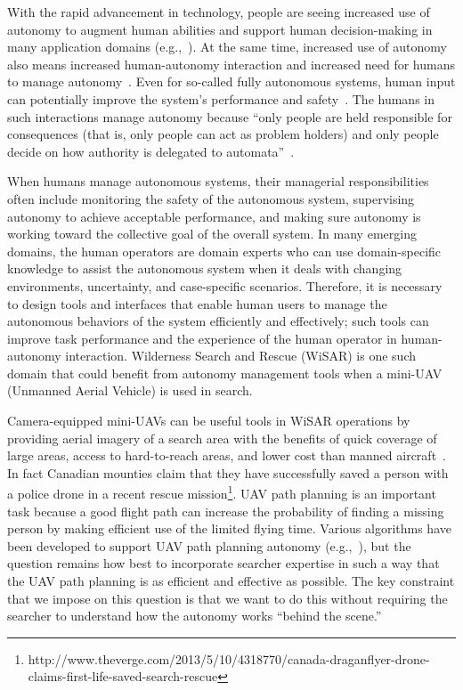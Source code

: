 With the rapid advancement in technology, people are seeing increased use of autonomy to augment human abilities and support human decision-making in many application domains (e.g.,~\cite{Chun2010Limousine,Casper2003Human,Lin2010Supporting,Robins2009From}). At the same time, increased use of autonomy also means increased human-autonomy interaction and increased need for humans to manage autonomy~\cite{Bainbridge1983Ironies}. Even for so-called fully autonomous systems, human input can potentially improve the system's performance and safety~\cite{Bradshaw2013Seven}. The humans in such interactions manage autonomy because ``only people are held responsible for consequences (that is, only people can act as problem holders) and only people decide on how authority is delegated to automata''~\cite{Woods2006Joint}.

When humans manage autonomous systems, their managerial responsibilities often include monitoring the safety of the autonomous system, supervising autonomy to achieve acceptable performance, and making sure autonomy is working toward the collective goal of the overall system. In many emerging domains, the human operators are domain experts who can use domain-specific knowledge to assist the autonomous system when it deals with changing environments, uncertainty, and case-specific scenarios. Therefore, it is necessary to design tools and interfaces that enable human users to manage the autonomous behaviors of the system efficiently and effectively; such tools can improve task performance and the experience of the human operator in human-autonomy interaction. Wilderness Search and Rescue (WiSAR) is one such domain that could benefit from autonomy management tools when a mini-UAV (Unmanned Aerial Vehicle) is used in search.

Camera-equipped mini-UAVs can be useful tools in WiSAR operations by providing aerial imagery of a search area with the benefits of quick coverage of large areas, access to hard-to-reach areas, and lower cost than manned aircraft~\cite{Murphy2008Cooperative, Goodrich2008Supporting}. In fact Canadian mounties claim that they have successfully saved a person with a police drone in a recent rescue mission\footnote{http://www.theverge.com/2013/5/10/4318770/canada-draganflyer-drone-claims-first-life-saved-search-rescue}. UAV path planning is an important task because a good flight path can increase the probability of finding a missing person by making efficient use of the limited flying time. Various algorithms have been developed to support UAV path planning autonomy (e.g.,~\cite{Bourgault2003Coordinated, Lin2009UAV, Lin2014Hierarchical}), but the question remains how best to incorporate searcher expertise in such a way that the UAV path planning is as efficient and effective as possible.  The key constraint that we impose on this question is that we want to do this without requiring the searcher to understand how the autonomy works ``behind the scene.''

